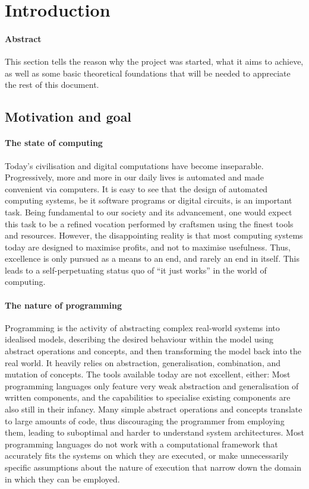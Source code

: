 \section{Introduction}
\paragraph{Abstract}
This section tells the reason why the {\tetra} project was started, what it aims to achieve, as well as some basic theoretical foundations that will be needed to appreciate the rest of this document.

\subsection{Motivation and goal}

\paragraph{The state of computing}
Today's civilisation and digital computations have become inseparable.
Progressively, more and more in our daily lives is automated and made convenient via computers.
It is easy to see that the design of automated computing systems, be it software programs or digital circuits, is an important task.
Being fundamental to our society and its advancement, one would expect this task to be a refined vocation performed by craftsmen using the finest tools and resources.
However, the disappointing reality is that most computing systems today are designed to maximise profits, and not to maximise usefulness.
Thus, excellence is only pursued as a means to an end, and rarely an end in itself.
This leads to a self-perpetuating status quo of ``it just works'' in the world of computing.

\paragraph{The nature of programming}
Programming is the activity of abstracting complex real-world systems into idealised models, describing the desired behaviour within the model using abstract operations and concepts, and then transforming the model back into the real world.
It heavily relies on abstraction, generalisation, combination, and mutation of concepts.
The tools available today are not excellent, either:
	Most programming languages only feature very weak abstraction and generalisation of written components, and the capabilities to specialise existing components are also still in their infancy.
	Many simple abstract operations and concepts translate to large amounts of code, thus discouraging the programmer from employing them, leading to suboptimal and harder to understand system architectures.
	Most programming languages do not work with a computational framework that accurately fits the systems on which they are executed, or make unnecessarily specific assumptions about the nature of execution that narrow down the domain in which they can be employed.

